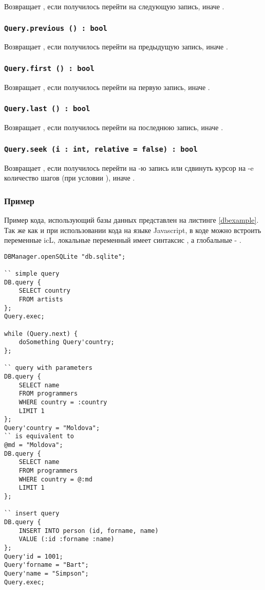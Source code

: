 Возвращает \true, если получилось перейти на следующую запись, иначе \false.

\subsubsection{\lstinline|Query.previous () : bool|}

Возвращает \true, если получилось перейти на предыдущую запись, иначе \false.

\subsubsection{\lstinline|Query.first () : bool|}

Возвращает \true, если получилось перейти на первую запись, иначе \false.

\subsubsection{\lstinline|Query.last () : bool|}

Возвращает \true, если получилось перейти на последнюю запись, иначе \false.

\subsubsection{\lstinline|Query.seek (i : int, relative = false) : bool|}

Возвращает \true, если получилось перейти на -ю запись или сдвинуть курсор на -e количество шагов (при условии ), иначе \false.

\subsubsection{Пример}

Пример кода, использующий базы данных представлен на листинге \ref{dbexample}. Так же как и при использовании кода на языке Javascript, в коде можно встроить переменные icL, локальные переменный имеет синтаксис , а глобальные - .

\begin{lstlisting}[caption=Пример кода использующий базу данных, label=dbexample]
DBManager.openSQLite "db.sqlite";

`` simple query
DB.query {
	SELECT country
	FROM artists
};
Query.exec;

while (Query.next) {
    doSomething Query'country;
};

`` query with parameters
DB.query {
	SELECT name
	FROM programmers
	WHERE country = :country
	LIMIT 1
};
Query'country = "Moldova";
`` is equivalent to
@md = "Moldova";
DB.query {
	SELECT name
	FROM programmers
	WHERE country = @:md
	LIMIT 1
};

`` insert query
DB.query {
	INSERT INTO person (id, forname, name)
	VALUE (:id :forname :name)
};
Query'id = 1001;
Query'forname = "Bart";
Query'name = "Simpson";
Query.exec;
\end{lstlisting}

